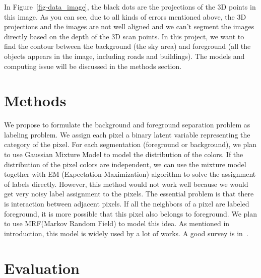 \documentclass{article} %
\begin{document}
In Figure~\ref{fig-data_image}, the black dots are the projections of
the 3D points in this image. As you can see, due to all kinds of
errors mentioned above, the 3D projections and the images are not well
aligned and we can't segment the images directly based on the depth of
the 3D scan points. In this project, we want to find the contour
between the background (the sky area) and foreground (all the objects
appears in the image, including roads and buildings). The models and
computing issue will be discussed in the methods section.

\section{Methods}

We propose to formulate the background and foreground separation
problem as labeling problem. We assign each pixel a binary latent
variable representing the category of the pixel. For each
segmentation (foreground or background), we plan to use Gaussian Mixture Model to model the
distribution of the colors. If the distribution of the pixel colors
are independent, we can use the mixture model together with EM
(Expectation-Maximization) algorithm to solve the assignment of labels
directly. However, this method would not work well because we would
get very noisy label assignment to the pixels. The essential problem
is that there is interaction between adjacent pixels. If all the
neighbors of a pixel are labeled foreground, it is more possible that
this pixel also belongs to foreground. We plan to
use MRF(Markov Random Field) to model this idea. As mentioned in
introduction, this model is widely used by a lot of works. A good
survey is in~\citep{Szeliski2008Comparative}.

\section{Evaluation}




\end{document}
